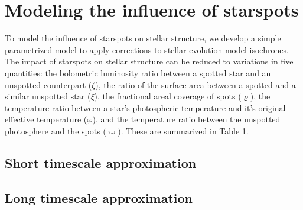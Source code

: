 \section{Modeling the influence of starspots}

To model the influence of starspots on stellar structure, we develop a simple parametrized model to apply corrections to stellar evolution model isochrones. The impact of starspots on stellar structure can be reduced to variations in five quantities: the bolometric luminosity ratio between a spotted star and an unspotted counterpart ($\zeta$), the ratio of the surface area between a spotted and a similar unspotted star ($\xi$), the fractional areal coverage of spots ($\varrho$), the temperature ratio between a star’s photospheric temperature and it's original effective temperature ($\varphi$), and the temperature ratio between the unspotted photosphere and the spots ($\varpi$). These are summarized in Table 1.

\subsection{Short timescale approximation}

\subsection{Long timescale approximation}